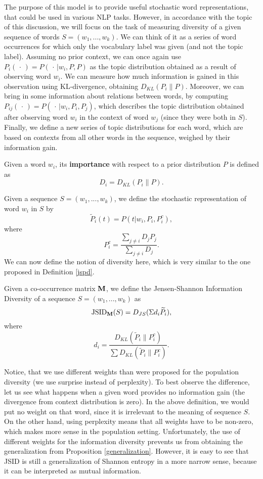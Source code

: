 \documentclass{article} %
\begin{document}
The purpose of this model is to provide useful stochastic
word representations, that could be used in various NLP
tasks. However, in accordance with the topic of this discussion, we will
focus on the task of measuring diversity of a given sequence of words
$S=(w_1,...,w_k)$. We can think of it as a series of word occurrences for
which only the vocabulary label was given (and not the topic
label). Assuming no prior context, we can once again use
$P_i(\,\cdot\,)=P(\,\cdot\,|w_i,P,P)$  as the topic distribution
obtained as a result 
of observing word $w_i$. We can measure how much information is gained
in this observation using KL-divergence, obtaining
$D_{KL}(P_i\|P)$. Moreover, we can bring in some information about
relations between words, by computing $P_{ij}(\,\cdot\,) =
P(\,\cdot\,|w_i,P_i,P_j)$, 
which describes the topic distribution obtained after observing word
$w_i$ in the context of word $w_j$ (since they were both in
$S$). Finally, we define a new series of topic
distributions for each word, which are based on contexts from all other
words in the sequence, weighed by their information gain.

\bed
Given a word $w_i$, its {\bf importance} with respect to a
prior distribution $P$ is defined as 
\[D_i = D_{KL}(P_i\|P).\]
\eed

\bed
Given a sequence $S=(w_1,...,w_k)$, we define the stochastic
representation of word $w_i$ in $S$ by 
\[\widetilde{P}_i(t) = P(t|w_i,P_i,P_i^c),\]
where
\[P_i^c = \frac{\sum_{j\neq i} D_jP_j}{\sum_{j\neq i}D_j}.\]
\eed
We can now define the notion of diversity here, which is very similar
to the one proposed in Definition \ref{jspd}.

\bed
Given a co-occurrence matrix $\operatorname{\mathbf{M}}$, we define the Jensen-Shannon
Information Diversity of a sequence 
$S=(w_1,...,w_k)$ as
\[\mbox{JSID}_{\operatorname{\mathbf{M}}}(S)=D_{JS}(\Sigma d_i \widetilde{P}_i),\]
where 
\[d_{i}=\frac{D_{KL}(\widetilde{P}_i\|P_i^c)}{\sum D_{KL}(\widetilde{P}_i\|P_i^c)}.\]
\eed

Notice, that we use different weights than were proposed for the
population diversity (we use surprise instead of perplexity). To
best observe the difference, let us see what happens when a given word
provides no information gain (the divergence from context distribution
is zero). In the above definition, we would put no weight on that
word, since it is irrelevant to the meaning of sequence $S$. On the
other hand, using perplexity means that all weights have to be
non-zero, which makes more sense in the population
setting. Unfortunately, the
use of different weights for the information diversity prevents us
from obtaining the generalization from Proposition
\ref{generalization}. However, it is easy to see that JSID is still a
generalization of Shannon entropy in a more narrow sense, because it
can be interpreted as mutual information. 
\end{document}

